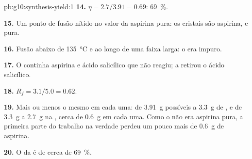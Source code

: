 \begin{solution}{pb:g10:synthesis-yield:1}
\textbf{14.} $\eta = 2.7 / 3.91 = 0.69$: \qty{69}{\percent}.

\textbf{15.} Um ponto de fusão nítido no valor da aspirina pura: os
cristais são aspirina, e pura.

\textbf{16.} Fusão abaixo de \qty{135}{\celsius} e ao longo de uma faixa
larga: o  era impuro.

\textbf{17.} O  continha aspirina e ácido salicílico que não
reagiu; a  retirou o ácido salicílico.

\textbf{18.} $R_f = 3.1 / 5.0 = 0.62$.

\textbf{19.} Mais ou menos o mesmo em cada uma: de \qty{3.91}{g}
possíveis a \qty{3.3}{g} de , e de \qty{3.3}{g} a
\qty{2.7}{g} na , cerca de \qty{0.6}{g} em cada uma. Como
o  não era aspirina pura, a primeira parte do trabalho na
verdade perdeu um pouco mais de \qty{0.6}{g} de aspirina.

\textbf{20.} O  da  é de cerca de \qty{69}{\percent}.
\end{solution}
